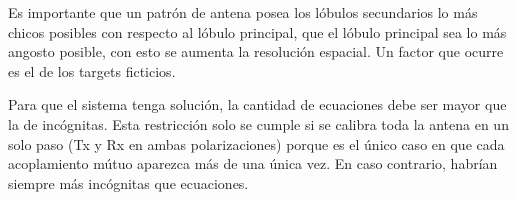 Es importante que un patrón de antena posea los lóbulos secundarios lo más chicos posibles con respecto al lóbulo principal,
que el lóbulo principal sea lo más angosto posible, con esto se aumenta la resolución espacial. Un factor que ocurre es el 
de los targets ficticios.



Para que el sistema tenga solución, la cantidad de ecuaciones debe ser mayor que la de incógnitas. Esta restricción solo 
se cumple si se calibra toda la antena en un solo paso (Tx y Rx en ambas polarizaciones) porque es el único caso en que 
cada acoplamiento mútuo aparezca más de una única vez. En caso contrario, habrían siempre más incógnitas que ecuaciones.





